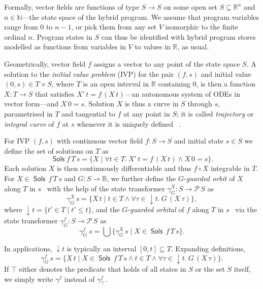 \documentclass[envcountsame]{llncs}
\newcommand{\Pow}{\mathcal{P}}
\newcommand{\reals}{\mathbb{R}}
\newcommand{\bools}{\mathbb{B}}
\newcommand{\Sols}{\mathop{\mathsf{Sols}}}
\begin{document}
Formally, vector fields are functions of type $S\to S$ on some open set
$S\subseteq \reals^n$ and $n\in\mathbb{N}$---the state space of
the hybrid program. We assume that program variables range from $0$ to
$n-1$, or pick them from any set $V$ isomorphic to the finite ordinal
$n$. Program states in $S$ can thus be identified with hybrid program
stores modelled as functions from variables in $V$ to values in
$\reals$, as usual.

Geometrically, vector field $f$ assigns a vector to any point of the
state space
$S$. A solution to the \emph{initial value problem} (IVP) for the pair
$(f,s)$ and initial value $(0,s)\in T\times S$, where $T$ is an open
interval in $\reals$ containing $0$, is then a function $X:T\to S$
that satisfies $X'\, t = f\, (X\, t)$---an autonomous system of ODEs
in vector form---and $X\, 0 = s$. Solution
$X$ is thus a curve in $S$ through $s$, parametrised in $T$ and
tangential to $f$ at any point in $S$; it is called \emph{trajectory}
or \emph{integral curve} of $f$ at $s$ whenever it is uniquely
defined ~\cite{Hirsch09,Teschl12}.

For IVP $(f,s)$ with continuous vector field $f:S\to S$ and initial
state $s\in S$ we define the set of solutions on
$T$ as
\begin{equation*}
\Sols f\, T\, s = \{X \mid \forall t\in T.\  X'\, t = f\, (X\, t)\land X\, 0 = s\}.
\end{equation*}
Each solution $X$ is then continuously differentiable and thus
$f\circ X$ integrable in $T$.  For $X\in \Sols\, f\, T\, s$ and
$G:S\to\bools$, we further define the $G$-\emph{guarded orbit} of $X$
along $T$ in $s$~\cite{MuniveS19} with the help of the state transformer
$\gamma^X_G:S\to \Pow\, S$ as 
\begin{equation*}
\gamma^X_{G}\, s= \{X\, t\mid t\in T\land \forall \tau\in
{\downarrow}t.\ G\, (X\, \tau)\},
\end{equation*}
where ${\downarrow}t = \{t'\in T\mid t'\le t\}$, and the
$G$-\emph{guarded orbital} of $f$ along $T$ in $s$~\cite{MuniveS19}
via the state transformer $\gamma^f_G:S\to \Pow\, S$ as
\begin{equation*}
  \gamma^f_G\ s = \bigcup\{\gamma^X_G\, s\mid X\in \Sols\, f\, T\, s\}.
\end{equation*}

In applications, ${\downarrow}t$ is typically an interval
$[0,t]\subseteq T$.  Expanding definitions,
\begin{equation*}
\gamma^f_G\, s = \{X\, t \mid X\in \Sols\, f\, T\, s \land t\in T
\land \forall \tau\in{\downarrow}t.\ G\, (X\, \tau)\}.
\end{equation*}
If $\top$ either denotes the predicate that holds of all states in $S$
or the set $S$ itself, we simply write $\gamma^f$ instead of
$\gamma^f_\top$.
\end{document}
